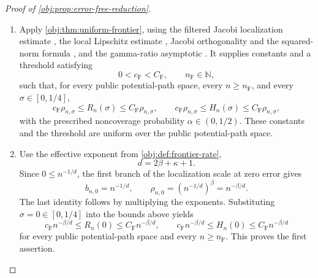 \begin{proof}[Proof of \cref{obj:prop:error-free-reduction}]
\begin{enumerate}
\item Apply \cref{obj:thm:uniform-frontier}, using the filtered Jacobi localization estimate \citep[Theorem 2.4, equation (2.14)]{PetrushevXu2005}, the local Lipschitz estimate \citep[Theorem 2.2, equation (2.4)]{https://people.math.sc.edu/pencho/Publications/kpx-06-28-06-web.pdf}, Jacobi orthogonality and the squared-norm formula \citep[Table 18.3.1, Jacobi row and caption]{https://dlmf.nist.gov/18.3}, and the gamma-ratio asymptotic \citep[equation (5.11.12)]{https://dlmf.nist.gov/5.11.E12}. It supplies constants and a threshold satisfying
\[
0<c_{\mathrm F}<C_{\mathrm F},
\qquad n_{\mathrm F}\in\mathbb N,
\]
such that, for every public potential-path space, every \(n\ge n_{\mathrm F}\), and every \(\sigma\in[0,1/4]\),
\[
c_{\mathrm F}\rho_{n,\sigma}
\le R_n(\sigma)\le C_{\mathrm F}\rho_{n,\sigma},
\qquad
c_{\mathrm F}\rho_{n,\sigma}
\le H_n(\sigma)\le C_{\mathrm F}\rho_{n,\sigma},
\]
with the prescribed noncoverage probability \(\alpha\in(0,1/2)\). These constants and the threshold are uniform over the public potential-path space.

\item Use the effective exponent from \cref{obj:def:frontier-rate},
\[
d=2\beta+\kappa+1.
\]
Since \(0\le n^{-1/d}\), the first branch of the localization scale at zero error gives
\[
b_{n,0}=n^{-1/d},
\qquad
\rho_{n,0}
=(n^{-1/d})^\beta
=n^{-\beta/d}.
\]
The last identity follows by multiplying the exponents. Substituting \(\sigma=0\in[0,1/4]\) into the bounds above yields
\[
c_{\mathrm F}n^{-\beta/d}
\le R_n(0)\le C_{\mathrm F}n^{-\beta/d},
\qquad
c_{\mathrm F}n^{-\beta/d}
\le H_n(0)\le C_{\mathrm F}n^{-\beta/d}
\]
for every public potential-path space and every \(n\ge n_{\mathrm F}\). This proves the first assertion.


\end{enumerate}
\end{proof}
